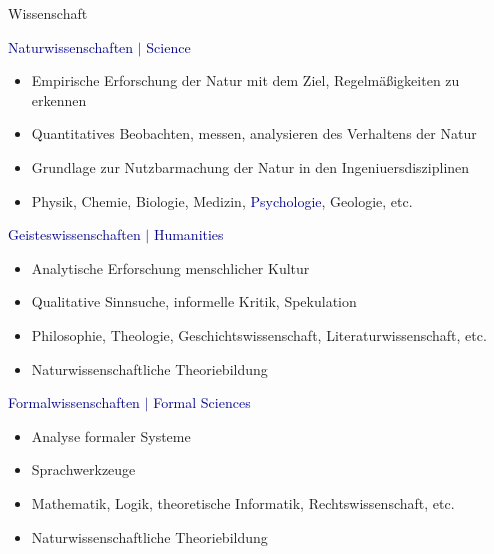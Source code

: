 \documentclass[
  8pt,
  ignorenonframetext,
]{beamer}
\providecommand{\tightlist}{%
  \setlength{\itemsep}{0pt}\setlength{\parskip}{0pt}}
\begin{document}
\begin{frame}{Wissenschaft}
\protect\hypertarget{wissenschaft-1}{}

\textcolor{darkblue}{Naturwissenschaften $\vert$ Science}

\begin{itemize}
\tightlist
\item
  Empirische Erforschung der Natur mit dem Ziel, Regelmäßigkeiten zu
  erkennen
\item
  Quantitatives Beobachten, messen, analysieren des Verhaltens der Natur
\item
  Grundlage zur Nutzbarmachung der Natur in den Ingeniuersdisziplinen
\item
  Physik, Chemie, Biologie, Medizin, \textcolor{darkblue}{Psychologie},
  Geologie, etc.
\end{itemize}

\textcolor{darkblue}{Geisteswissenschaften $\vert$ Humanities}

\begin{itemize}
\tightlist
\item
  Analytische Erforschung menschlicher Kultur
\item
  Qualitative Sinnsuche, informelle Kritik, Spekulation
\item
  Philosophie, Theologie, Geschichtswissenschaft, Literaturwissenschaft,
  etc.
\item
  Naturwissenschaftliche Theoriebildung
\end{itemize}

\textcolor{darkblue}{Formalwissenschaften $\vert$ Formal Sciences}

\begin{itemize}
\tightlist
\item
  Analyse formaler Systeme
\item
  Sprachwerkzeuge
\item
  Mathematik, Logik, theoretische Informatik, Rechtswissenschaft, etc.
\item
  Naturwissenschaftliche Theoriebildung
\end{itemize}
\end{frame}
\end{document}
